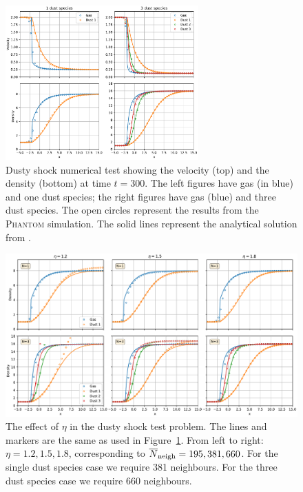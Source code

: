 \documentclass[fleqn,usenatbib]{mnras}
\begin{document}
\begin{figure}
   \begin{center}
      \includegraphics[width=0.66\textwidth]{figs/dustyshock_velocity_density.pdf}
      \caption{Dusty shock numerical test showing the velocity (top) and the
         density (bottom) at time \(t=300\). The left figures have gas (in blue)
         and one dust species; the right figures have gas (blue) and three dust
         species. The open circles represent the results from the
         \textsc{Phantom} simulation. The solid lines represent the analytical
         solution from \citet{Benitez-Llambay2019ApJS..241...25B}.%
         \label{fig:dustyshock_final}}
   \end{center}
\end{figure}

\begin{figure}
   \begin{center}
      \includegraphics[width=\textwidth]{figs/dustyshock_hfact.pdf}
      \caption{The effect of \(\eta\) in the dusty shock test problem.
         The lines and markers are the same as used in
         Figure~\ref{fig:dustyshock_final}. From left to right: \(\eta =
         1.2, 1.5, 1.8\), corresponding to \(\overline{N}_{\rm neigh} = 195,
         381, 660\). For the single dust species case we require 381 neighbours.
         For the three dust species case we require 660 neighbours.%
         \label{fig:dustyshock_hfact}}
   \end{center}
\end{figure}
\end{document}
